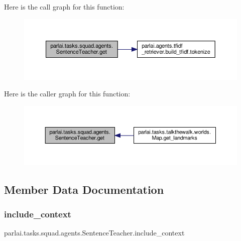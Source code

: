 Here is the call graph for this function\+:
\nopagebreak
\begin{figure}[H]
\begin{center}
\leavevmode
\includegraphics[width=350pt]{classparlai_1_1tasks_1_1squad_1_1agents_1_1SentenceTeacher_a940eaa197e21e8237fc459e55d68d61f_cgraph}
\end{center}
\end{figure}
Here is the caller graph for this function\+:
\nopagebreak
\begin{figure}[H]
\begin{center}
\leavevmode
\includegraphics[width=350pt]{classparlai_1_1tasks_1_1squad_1_1agents_1_1SentenceTeacher_a940eaa197e21e8237fc459e55d68d61f_icgraph}
\end{center}
\end{figure}


\subsection{Member Data Documentation}
\mbox{\label{classparlai_1_1tasks_1_1squad_1_1agents_1_1SentenceTeacher_a499aa8bdcd4d4af34d87a79fe7186854}} 
\subsubsection{\texorpdfstring{include\+\_\+context}{include\_context}}
{\footnotesize\ttfamily parlai.\+tasks.\+squad.\+agents.\+Sentence\+Teacher.\+include\+\_\+context}



